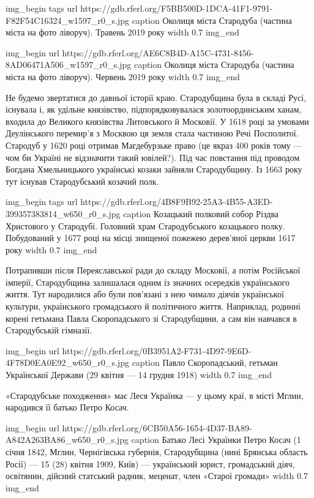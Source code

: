 \ifcmt
img_begin 
  tags 
  url https://gdb.rferl.org/F5BB500D-1DCA-41F1-9791-F82F54C16324_w1597_r0_s.jpg
  caption Околиця міста Стародуба (частина міста на фото ліворуч). Травень 2019 року
  width 0.7
img_end
\fi

\ifcmt
img_begin 
  url https://gdb.rferl.org/AE6C8B4D-A15C-4731-8456-8AD06471A506_w1597_r0_s.jpg
  caption Околиця міста Стародуба (частина міста на фото ліворуч). Червень 2019 року 
  width 0.7
img_end
\fi

Не будемо звертатися до давньої історії краю. Стародубщина була в складі Русі,
існувала і, як удільне князівство, підпорядковувалася золотоординським ханам,
входила до Великого князівства Литовського й Московії. У 1618 році за умовами
Деулінського перемир’я з Москвою ця земля стала частиною Речі Посполитої.
Стародуб у 1620 році отримав Магдебурзьке право (це якраз 400 років тому --- чом
би Україні не відзначити такий ювілей?). Під час повстання під проводом Богдана
Хмельницького українські козаки зайняли Стародубщину. Із 1663 року тут існував
Стародубський козачий полк.

\ifcmt
img_begin 
  tags 
  url https://gdb.rferl.org/4B8F9B92-25A3-4B55-A3ED-399357383814_w650_r0_s.jpg
  caption Козацький полковий собор Різдва Христового у Стародубі. Головний храм
  Стародубського козацького полку. Побудований у 1677 році на місці знищеної
  пожежею дерев’яної церкви 1617 року
  width 0.7
img_end
\fi

Потрапивши після Переяславської ради до складу Московії, а потім Російської
імперії, Стародубщина залишалася одним із значних осередків українського життя.
Тут народилися або були пов’язані з нею чимало діячів української культури,
українського громадського й політичного життя. Наприклад, родинні корені
гетьмана Павла Скоропадського зі Стародубщини, а сам він навчався в
Стародубській гімназії.

\ifcmt
img_begin 
  url https://gdb.rferl.org/0B3951A2-F731-4D97-9E6D-4F78D0EA0E92_w650_r0_s.jpg
  caption Павло Скоропадський, гетьман Української Держави (29 квітня --- 14 грудня 1918)
  width 0.7
img_end
\fi

«Стародубське походження» має Леся Українка --- у цьому краї, в місті Мглин,
народився її батько Петро Косач.

\ifcmt
img_begin 
  url https://gdb.rferl.org/6CB50A56-1654-4D37-BA89-A842A263BA86_w650_r0_s.jpg
  caption Батько Лесі Українки Петро Косач (1 січня 1842, Мглин, Чернігівська
  губернія, Стародубщина (нині Брянська область Росії) --- 15 (28) квітня 1909,
  Київ) --- український юрист, громадський діяч, освітянин, дійсний статський
  радник, меценат, член «Старої громади»
  width 0.7
img_end
\fi


